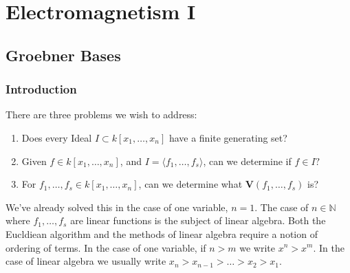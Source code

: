 \documentclass[crop=false,class=article,oneside]{standalone}
\begin{document}
    \ifx\ifgeoalg\undefined
        \section*{Electromagnetism I}
        \setcounter{section}{1}
    \fi
    \subsection{Groebner Bases}
        \subsubsection{Introduction}
        There are three problems we wish to address:
        \begin{enumerate}
            \item Does every Ideal $I\subset k[x_1,\hdots ,x_n]$ have a finite generating set?
            \item Given $f\in k[x_1,\hdots ,x_n]$, and $I = \langle f_1,\hdots, f_s\rangle$, can we determine if $f\in I?$
            \item For $f_1,\hdots, f_s \in k[x_1,\hdots ,x_n]$, can we determine what $\mathbf{V}(f_1,\hdots, f_s)$ is?
        \end{enumerate}
        We've already solved this in the case of one variable, $n=1$. The case of $n\in \mathbb{N}$ where $f_1,\hdots, f_s$ are linear functions is the subject of linear algebra. Both the Eucldiean algorithm and the methods of linear algebra require a notion of ordering of terms. In the case of one variable, if $n>m$ we write $x^n>x^m$. In the case of linear algebra we usually write $x_n>x_{n-1}>\hdots > x_2 > x_1$. 
\end{document}
